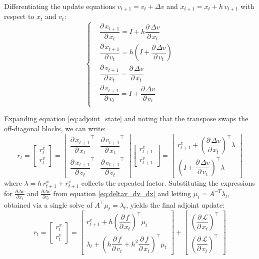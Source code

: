 \documentclass{article}
\newcommand{\pd}[2]{\dfrac{\partial\, #1}{\partial\, #2}}
\newcommand{\pdc}[2]{\frac{\partial #1}{\partial #2}}
\begin{document}
Differentiating the update equations $v_{t+1} = v_t + \Delta v$ and 
$x_{t+1} = x_t + h\,v_{t+1}$ with respect to $x_t$ and $v_t$:
\begin{equation}
    \left\{
    \begin{aligned}
    & \pd{x_{t+1}}{x_t} = I + h \pd{\Delta v}{x_t} \\[1ex]
    & \pd{x_{t+1}}{v_t} = h\left(I + \pd{\Delta v}{v_t}\right) \\[1ex]
    & \pd{v_{t+1}}{x_t} = \pd{\Delta v}{x_t} \\[1ex]
    & \pd{v_{t+1}}{v_t} = I + \pd{\Delta v}{v_t} \\
    \end{aligned}
    \right.
\end{equation}

Expanding equation \ref{eq:adjoint_state} and noting that the transpose swaps the off-diagonal blocks, we can write:
\begin{equation}
    r_t = 
    \begin{bmatrix}
        r_t^x \\[1.5ex]
        r_t^v 
    \end{bmatrix} = 
    \begin{bmatrix}
        \pd{x_{t+1}}{x_t}^\top & \pd{v_{t+1}}{x_t}^\top  \\[1.5ex]
        \pd{x_{t+1}}{v_t}^\top & \pd{v_{t+1}}{v_t}^\top
    \end{bmatrix}
    \begin{bmatrix}
        r_{t+1}^x \\[1.5ex]
        r_{t+1}^v 
    \end{bmatrix} =
    \begin{bmatrix}
        r_{t+1}^x + \left(\pd{\Delta v}{x_t}\right)^\top \lambda \\[1.5ex]
        \left(I + \pd{\Delta v}{v_t}\right)^\top \lambda
    \end{bmatrix}
\end{equation}
where $\lambda = h\,r_{t+1}^x + r_{t+1}^v$ collects the repeated factor. Substituting the expressions for $\pdc{\Delta v}{x_t}$ and $\pdc{\Delta v}{v_t}$  from equation \ref{eq:deltav_dv_dx} and letting $\mu_t = A^{-T}\lambda_t$, obtained via a single solve of $A^\top\mu_t = \lambda_t$, yields the final adjoint update:
\begin{equation}
    \boxed{
    r_t = 
    \begin{bmatrix}
        r_t^x \\[1.5ex]
        r_t^v 
    \end{bmatrix} = 
    \begin{bmatrix}
        r_{t+1}^x + h\left(\pd{f}{x_t}\right)^\top \mu_t \\[1.5ex]
        \lambda_t + \left(h\pd{f}{v_t} + h^2\pd{f}{x_t}\right)^\top\mu_t
    \end{bmatrix} + 
    \begin{bmatrix}
        \left(\pd{\mathcal{L}}{x_t}\right)^\top \\[1.5ex]
        \left(\pd{\mathcal{L}}{v_t}\right)^\top
    \end{bmatrix}
    }
\end{equation}
\end{document}
